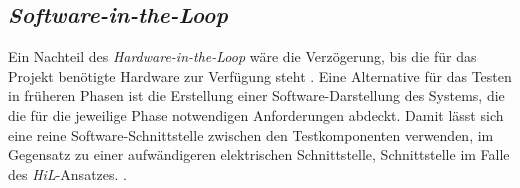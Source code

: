\subsection{\textit{Software-in-the-Loop}}
Ein Nachteil des \textit{Hardware-in-the-Loop} wäre die Verzögerung, bis die für das Projekt benötigte Hardware zur Verfügung steht \cite{zimmerDurchgaengigerSimulationsprozessZur2015}. Eine Alternative für das Testen in früheren Phasen ist die Erstellung einer Software-Darstellung des Systems, die die für die jeweilige Phase notwendigen Anforderungen abdeckt. Damit lässt sich eine reine Software-Schnittstelle zwischen den Testkomponenten verwenden, im Gegensatz zu einer aufwändigeren elektrischen Schnittstelle, Schnittstelle im Falle des \textit{HiL}-Ansatzes. \cite{zimmerDurchgaengigerSimulationsprozessZur2015}. 


